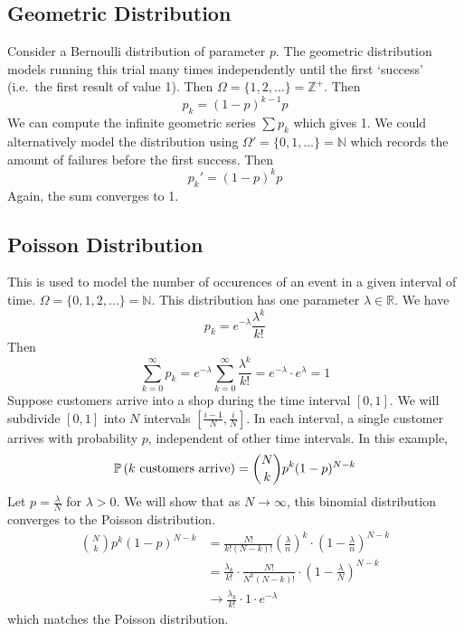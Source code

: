 \subsection{Geometric Distribution}
Consider a Bernoulli distribution of parameter \(p\). The geometric distribution models running this trial many times independently until the first `success' (i.e.\ the first result of value 1). Then \(\Omega = \{ 1, 2, \dots \} = \mathbb Z^+\). Then
\[ p_k = (1-p)^{k-1}p \]
We can compute the infinite geometric series \(\sum p_k\) which gives 1. We could alternatively model the distribution using \(\Omega' = \{ 0, 1, \dots \} = \mathbb N\) which records the amount of failures before the first success. Then
\[ p_k' = (1-p)^k p \]
Again, the sum converges to 1.

\subsection{Poisson Distribution}
This is used to model the number of occurences of an event in a given interval of time. \(\Omega = \{ 0, 1, 2, \dots \} = \mathbb N\). This distribution has one parameter \(\lambda \in \mathbb R\). We have
\[ p_k = e^{-\lambda} \frac{\lambda^k}{k!} \]
Then
\[ \sum_{k=0}^\infty p_k = e^{-\lambda}  \sum_{k=0}^\infty \frac{\lambda^k}{k!} = e^{-\lambda} \cdot e^{\lambda} = 1 \]
Suppose customers arrive into a shop during the time interval \([0, 1]\). We will subdivide \([0, 1]\) into \(N\) intervals \(\left[ \frac{i-1}{N}, \frac{i}{N} \right]\). In each interval, a single customer arrives with probability \(p\), independent of other time intervals. In this example,
\[ \mathbb{P}\left({k \text{ customers arrive}}\right) = \binom{N}{k} p^k (1-p)^{N-k} \]
Let \(p = \frac{\lambda}{N}\) for \(\lambda > 0\). We will show that as \(N \to \infty\), this binomial distribution converges to the Poisson distribution.
\begin{align*}
	\binom{N}{k} p^k (1-p)^{N-k} & = \frac{N!}{k!(N-k)!} \left( \frac{\lambda}{n} \right)^k \cdot \left( 1 - \frac{\lambda}{n} \right)^{N-k} \\
	                             & = \frac{\lambda_k}{k!} \cdot \frac{N!}{N^k(N-k)!} \cdot \left( 1 - \frac{\lambda}{N} \right)^{N-k}        \\
	                             & \to \frac{\lambda_k}{k!} \cdot 1 \cdot e^{-\lambda}
\end{align*}
which matches the Poisson distribution.

